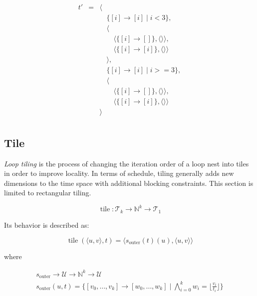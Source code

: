 \documentclass{article}
\DeclareMathOperator\tile{tile}
\begin{document}
\[
    \begin{array}{lcl}
        t'&=& \langle \\
          & & \quad\{[i] \rightarrow [i] \mid i < 3 \},\\
          & & \quad\langle \\
          & & \quad\quad \langle\{ [i] \rightarrow [] \}, \langle\rangle\rangle,\\
          & & \quad\quad \langle\{ [i] \rightarrow [i] \}, \langle\rangle\rangle\\
          & & \quad\rangle, \\
          & & \quad\{[i] \rightarrow [i] \mid i >= 3 \},\\
          & & \quad\langle \\
          & & \quad\quad \langle\{ [i] \rightarrow [] \}, \langle\rangle\rangle,\\
          & & \quad\quad \langle\{ [i] \rightarrow [i] \}, \langle\rangle\rangle\\
          & & \rangle \\
    \end{array}
\]

\subsection{Tile}

\emph{Loop tiling} is the process of changing the iteration order of a loop
nest into tiles in order to improve locality. In terms of schedule, tiling
generally adds new dimensions to the time space with additional blocking
constraints. This section is limited to rectangular tiling.

\[
    \tile: \mathcal{T}_k \rightarrow \mathbb{N}^k \rightarrow \mathcal{T}_1
\]

Its behavior is described as:

\[
    \tile(\langle u, v\rangle, t) = \langle  s_\mathrm{outer}(t)(u), \langle  u, v \rangle \rangle
\]

\noindent where

\[
    \begin{array}{l}
        s_\mathrm{outer} \rightarrow \mathcal{U} \rightarrow \mathbb{N}^k \rightarrow \mathcal{U} \\
        s_\mathrm{outer}(u, t) = \{ [v_0, \ldots, v_k] \rightarrow [w_0, \ldots, w_k] \mid \bigwedge_{i=0}^k w_i = \lfloor \frac{v_i}{t_i} \rfloor \}
    \end{array}
\]
\end{document}
